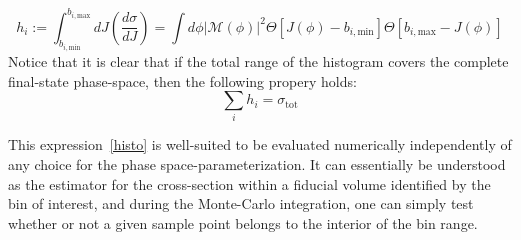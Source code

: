 \begin{equation}
\label{histo}
h_i := \int_{b_{i,\text{min}}}^{b_{i,\text{max}}} dJ \left( \frac{d \sigma}{d J}\right) = \int d \phi |\mathcal{M}(\phi)|^2 \Theta \left[ J(\phi) -b_{i,\text{min}} \right] \Theta \left[b_{i,\text{max}}-J(\phi) \right]
\end{equation}
Notice that it is clear that if the total range of the histogram covers the complete final-state phase-space, then the following propery holds:
\begin{equation}    
\sum_i h_i = \sigma_{\text{tot}}
\end{equation}

This expression~\eqref{histo} is well-suited to be evaluated numerically independently of any choice for the phase space-parameterization. It can essentially be understood as the estimator for the cross-section within a fiducial volume identified by the bin of interest, and during the Monte-Carlo integration, one can simply test whether or not a given sample point belongs to the interior of the bin range.


